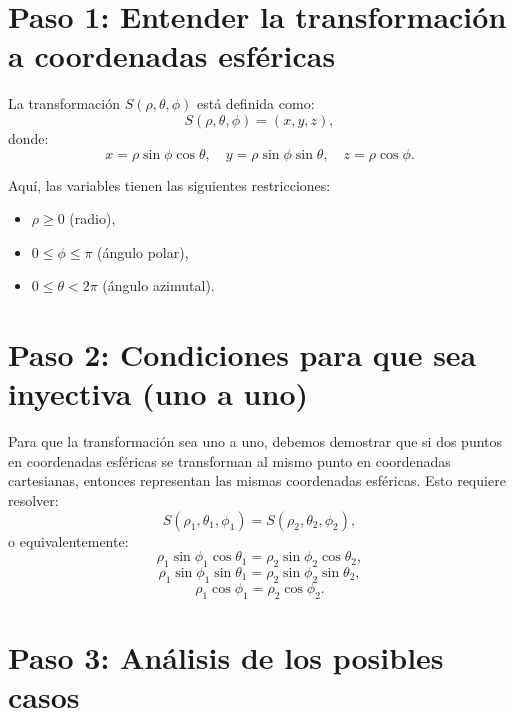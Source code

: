 \section*{Paso 1: Entender la transformación a coordenadas esféricas}

La transformación \( S(\rho, \theta, \phi) \) está definida como:
\[
S(\rho, \theta, \phi) = (x, y, z),
\]
donde:
\[
x = \rho \sin \phi \cos \theta, \quad y = \rho \sin \phi \sin \theta, \quad z = \rho \cos \phi.
\]

Aquí, las variables tienen las siguientes restricciones:
\begin{itemize}
    \item \( \rho \geq 0 \) (radio),
    \item \( 0 \leq \phi \leq \pi \) (ángulo polar),
    \item \( 0 \leq \theta < 2\pi \) (ángulo azimutal).
\end{itemize}

\section*{Paso 2: Condiciones para que sea inyectiva (uno a uno)}

Para que la transformación sea uno a uno, debemos demostrar que si dos puntos en coordenadas esféricas se transforman al mismo punto en coordenadas cartesianas, entonces representan las mismas coordenadas esféricas. Esto requiere resolver:
\[
S(\rho_1, \theta_1, \phi_1) = S(\rho_2, \theta_2, \phi_2),
\]
o equivalentemente:
\[
\rho_1 \sin \phi_1 \cos \theta_1 = \rho_2 \sin \phi_2 \cos \theta_2,
\]
\[
\rho_1 \sin \phi_1 \sin \theta_1 = \rho_2 \sin \phi_2 \sin \theta_2,
\]
\[
\rho_1 \cos \phi_1 = \rho_2 \cos \phi_2.
\]

\section*{Paso 3: Análisis de los posibles casos}

